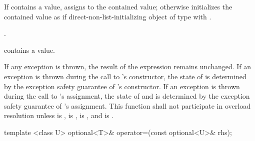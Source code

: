 \begin{itemdescr}
\pnum
\effects
If  contains a value, assigns  to the contained value; otherwise initializes the contained value as if direct-non-list-initializing object of type  with .

\pnum
\returns
{}.

\pnum
\postconditions
{} contains a value.

\pnum
\remarks
If any exception is thrown, the result of the expression  remains unchanged. If an exception is thrown during the call to 's constructor, the state of  is determined by the exception safety guarantee of 's constructor. If an exception is thrown during the call to 's assignment, the state of  and  is determined by the exception safety guarantee of 's assignment.
This function shall not participate in overload resolution unless
 is ,
 is ,
 is , and
 is .
\end{itemdescr}

%
\begin{itemdecl}
template <class U> optional<T>& operator=(const optional<U>& rhs);
\end{itemdecl}

